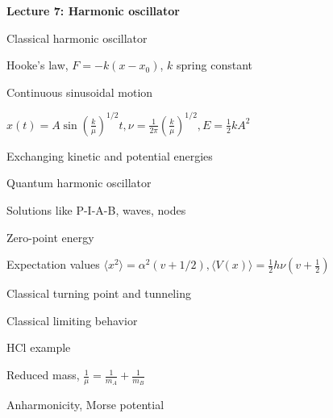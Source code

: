 \documentclass[11pt]{article}
\begin{document}
\begin{outline}
\item{{\bf Lecture 7: Harmonic oscillator}}
  \begin{outline}
  \item{Classical harmonic oscillator}
    \begin{outline}
    \item Hooke's law, $F=-k(x-x_0)$, $k$ spring constant
   \item Continuous sinusoidal motion
    \item $x(t)=A \sin(\frac{k}{\mu})^{1/2}t, \nu=\frac{1}{2\pi}(\frac{k}{\mu})^{1/2}, E=\frac{1}{2}kA^2$
    \item Exchanging kinetic and potential energies
    \end{outline}
  \item Quantum harmonic oscillator
    \begin{outline}
    \item Solutions like P-I-A-B, waves, nodes
   \item Zero-point energy
    \item Expectation values $\langle x^2 \rangle =
      \alpha^2 (v+1/2), \langle V(x) \rangle = \frac{1}{2} h\nu (v+\frac{1}{2})$
    \item Classical turning point and tunneling
    \item Classical limiting behavior
    \end{outline}
  \item HCl example
    \begin{outline}
          \item Reduced mass, $\frac{1}{\mu}=\frac{1}{m_A}+\frac{1}{m_B}$
    \end{outline}
    \item Anharmonicity, Morse potential
  \end{outline}


\end{outline}
\end{document}
